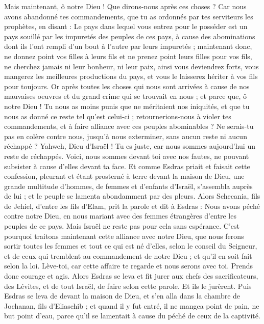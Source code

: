 \begin{multicols}{2}
Mais maintenant, ô notre Dieu ! Que dirons-nous après ces choses ? Car nous avons abandonné tes commandements,
que tu as ordonnés par tes serviteurs les prophètes, en disant : Le pays dans lequel vous entrez pour le posséder est un pays souillé par les impuretés des peuples de ces pays, à cause des abominations dont ils l'ont rempli d'un bout à l'autre par leurs impuretés ;
maintenant donc, ne donnez point vos filles à leurs fils et ne prenez point leurs filles pour vos fils, ne cherchez jamais ni leur bonheur, ni leur paix, ainsi vous deviendrez forts, vous mangerez les meilleures productions du pays, et vous le laisserez hériter à vos fils pour toujours.
Or après toutes les choses qui nous sont arrivées à cause de nos mauvaises oeuvres et du grand crime qui se trouvait en nous ; et parce que, ô notre Dieu ! Tu nous as moins punis que ne méritaient nos iniquités, et que tu nous as donné ce reste tel qu'est celui-ci ;
retournerions-nous à violer tes commandements, et à faire alliance avec ces peuples abominables ? Ne serais-tu pas en colère contre nous, jusqu'à nous exterminer, sans aucun reste ni aucun réchappé ?
Yahweh, Dieu d'Israël ! Tu es juste, car nous sommes aujourd'hui un reste de réchappés. Voici, nous sommes devant toi avec nos fautes, ne pouvant subsister à cause d'elles devant ta face.
\VerseOne{}Et comme Esdras priait et faisait cette confession, pleurant et étant prosterné à terre devant la maison de Dieu, une grande multitude d'hommes, de femmes et d'enfants d'Israël, s'assembla auprès de lui ; et le peuple se lamenta abondamment par des pleurs.
Alors Schecania, fils de Jehiel, d'entre les fils d'Elam, prit la parole et dit à Esdras : Nous avons péché contre notre Dieu, en nous mariant avec des femmes étrangères d'entre les peuples de ce pays. Mais Israël ne reste pas pour cela sans espérance.
C'est pourquoi traitons maintenant cette alliance avec notre Dieu, que nous ferons sortir toutes les femmes et tout ce qui est né d'elles, selon le conseil du Seigneur, et de ceux qui tremblent au commandement de notre Dieu ; et qu'il en soit fait selon la loi.
Lève-toi, car cette affaire te regarde et nous serons avec toi. Prends donc courage et agis.
Alors Esdras se leva et fit jurer aux chefs des sacrificateurs, des Lévites, et de tout Israël, de faire selon cette parole. Et ils le jurèrent.
Puis Esdras se leva de devant la maison de Dieu, et s'en alla dans la chambre de Jochanan, fils d'Eliaschib ; et quand il y fut entré, il ne mangea point de pain, ne but point d'eau, parce qu'il se lamentait à cause du péché de ceux de la captivité.

\end{multicols}
